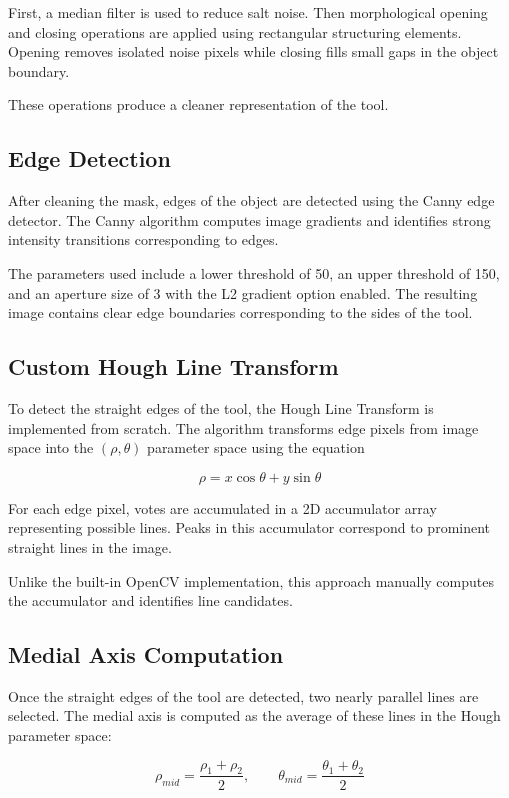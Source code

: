 \documentclass[letterpaper,10pt,conference]{ieeeconf}
\begin{document}
First, a median filter is used to reduce salt noise. 
Then morphological opening and closing operations are applied using rectangular structuring elements. 
Opening removes isolated noise pixels while closing fills small gaps in the object boundary.

These operations produce a cleaner representation of the tool.


\subsection{Edge Detection}

After cleaning the mask, edges of the object are detected using the Canny edge detector. 
The Canny algorithm computes image gradients and identifies strong intensity transitions corresponding to edges.

The parameters used include a lower threshold of 50, an upper threshold of 150, and an aperture size of 3 with the L2 gradient option enabled. 
The resulting image contains clear edge boundaries corresponding to the sides of the tool.


\subsection{Custom Hough Line Transform}

To detect the straight edges of the tool, the Hough Line Transform is implemented from scratch. 
The algorithm transforms edge pixels from image space into the $(\rho,\theta)$ parameter space using the equation

\[
\rho = x\cos\theta + y\sin\theta
\]

For each edge pixel, votes are accumulated in a 2D accumulator array representing possible lines. 
Peaks in this accumulator correspond to prominent straight lines in the image.

Unlike the built-in OpenCV implementation, this approach manually computes the accumulator and identifies line candidates.


\subsection{Medial Axis Computation}

Once the straight edges of the tool are detected, two nearly parallel lines are selected. 
The medial axis is computed as the average of these lines in the Hough parameter space:

\[
\rho_{mid} = \frac{\rho_1 + \rho_2}{2}, \qquad
\theta_{mid} = \frac{\theta_1 + \theta_2}{2}
\]
\end{document}
